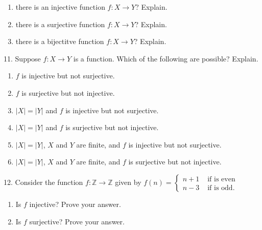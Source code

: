 \documentclass[10pt,]{book}
\theoremstyle{plain}
\theoremstyle{definition}
\theoremstyle{definition}
\theoremstyle{definition}
\numberwithin{equation}{chapter}
\def\Z{\mathbb Z}
\newcommand{\amp}{ & }
\begin{document}
\begin{exerciselist}
\begin{enumerate}[label=(\alph*)]
\item\hypertarget{li-345}{}
                there is an injective function \(f:X \to Y\)? Explain.
\item\hypertarget{li-346}{}
                there is a surjective function \(f:X \to Y\)? Explain.
\item\hypertarget{li-347}{}
                there is a bijectitve function \(f:X \to Y\)? Explain.
\end{enumerate}
\par\smallskip
\item[11.]\hypertarget{exercise-37}{}
            Suppose \(f:X \to Y\) is a function. Which of the following are possible? Explain.
\leavevmode%
\begin{enumerate}[label=(\alph*)]
\item\hypertarget{li-351}{}\(f\) is injective but not surjective.%
\item\hypertarget{li-352}{}\(f\) is surjective but not injective.%
\item\hypertarget{li-353}{}\(|X| = |Y|\) and \(f\) is injective but not surjective.%
\item\hypertarget{li-354}{}\(|X| = |Y|\) and \(f\) is surjective but not injective.%
\item\hypertarget{li-355}{}\(|X| = |Y|\), \(X\) and \(Y\) are finite, and \(f\) is injective but not surjective.%
\item\hypertarget{li-356}{}\(|X| = |Y|\), \(X\) and \(Y\) are finite, and \(f\) is surjective but not injective.%
\end{enumerate}
\par\smallskip
\item[12.]\hypertarget{exercise-38}{}
            Consider the function \(f:\Z \to \Z\) given by \(f(n) = \begin{cases}n+1 \amp  \mbox{ if  is even} \\ n-3 \amp \mbox{ if  is odd} . \end{cases}
            \)
\leavevmode%
\begin{enumerate}[label=(\alph*)]
\item\hypertarget{li-363}{}
                Is \(f\) injective? Prove your answer.
\item\hypertarget{li-364}{}
                Is \(f\) surjective? Prove your answer.
\end{enumerate}

\end{exerciselist}
\end{document}
